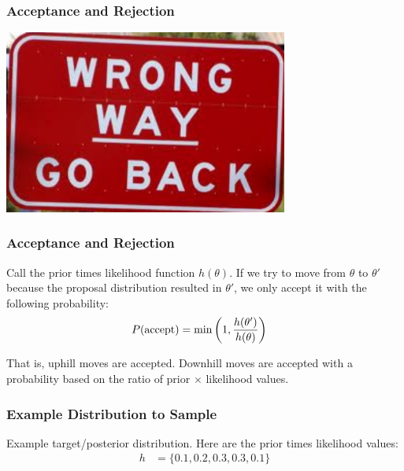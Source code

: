 \documentclass{beamer}
\begin{document}
\begin{frame}
\frametitle{Acceptance and Rejection}
\centering
\includegraphics[width=0.7\textwidth]{images/wrong_way.png}

\end{frame}

\begin{frame}
\frametitle{Acceptance and Rejection}
Call the prior times likelihood function $h(\theta)$.
If we try to move from $\theta$ to $\theta'$ because the proposal distribution
resulted in $\theta'$, we only accept it with the following probability:
\begin{align}
P(\textnormal{accept}) &= \min\left(1, \frac{h(\theta')}{h(\theta)}\right)
\end{align}
\pause

That is, uphill moves are accepted. Downhill moves are accepted with a probability
based on the ratio of prior $\times$ likelihood values.

\end{frame}

\begin{frame}
\frametitle{Example Distribution to Sample}
Example target/posterior distribution. Here are the prior times likelihood
values:
\begin{align}
h &= \{ 0.1, 0.2, 0.3, 0.3, 0.1 \}
\end{align}

\end{frame}
\end{document}
